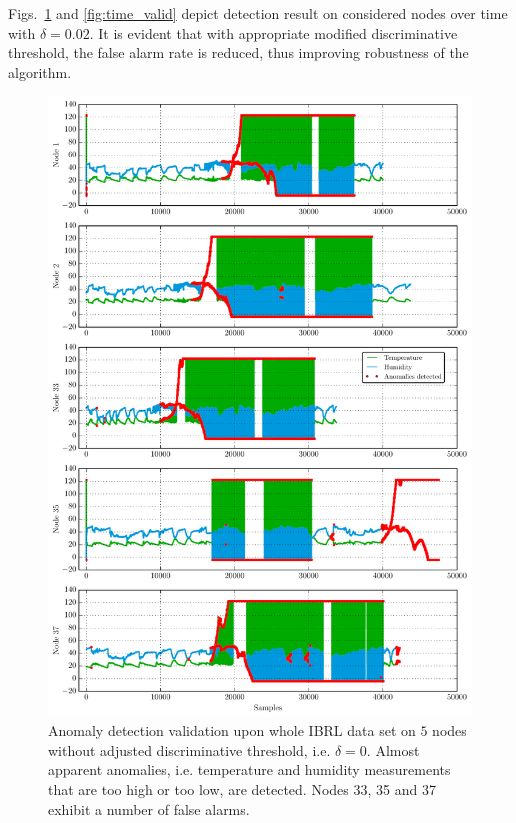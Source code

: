 \documentclass[conference]{IEEEtran}
\begin{document}
Figs.~\ref{fig:time_valid0} and \ref{fig:time_valid} depict detection result on considered nodes over time with $\delta=0.02$. It is evident that with appropriate modified discriminative threshold, the false alarm rate is reduced, thus improving robustness of the algorithm.
\begin{figure}
\centering
\includegraphics[scale=.4]{Python/time_validation0.pdf}
\caption{Anomaly detection validation upon whole IBRL data set on $5$ nodes without adjusted discriminative threshold, i.e. $\delta=0$. Almost apparent anomalies, i.e. temperature and humidity measurements that are too high or too low, are detected. Nodes 33, 35 and 37 exhibit a number of false alarms.}
\label{fig:time_valid0}
\end{figure}
\end{document}
